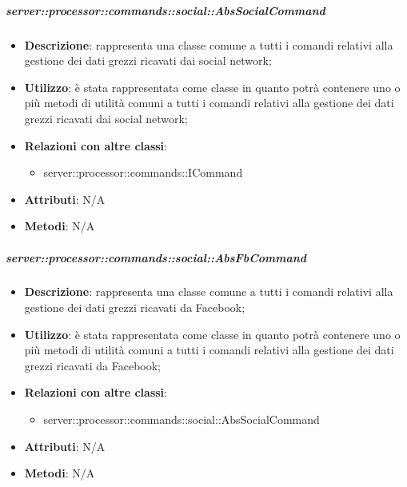         \subparagraph{server::processor::commands::social::AbsSocialCommand} %
        \label{subp:bdsm_app_server_processor_commands_social_abssocialcommand}
        \begin{itemize}
          \item \textbf{Descrizione}: rappresenta una classe comune a tutti i comandi relativi alla gestione dei dati grezzi ricavati dai social network;
          \item \textbf{Utilizzo}: è stata rappresentata come classe in quanto potrà contenere uno o più metodi di utilità comuni a tutti i comandi relativi alla gestione dei dati grezzi ricavati dai social network;
          \item \textbf{Relazioni con altre classi}:
            \begin{itemize}
              \item server::processor::commands::ICommand
            \end{itemize}
          \item \textbf{Attributi}: N/A
          \item \textbf{Metodi}: N/A
        \end{itemize}


        \subparagraph{server::processor::commands::social::AbsFbCommand} %
        \label{subp:bdsm_app_server_processor_commands_social_absfbcommand}
        \begin{itemize}
          \item \textbf{Descrizione}: rappresenta una classe comune a tutti i comandi relativi alla gestione dei dati grezzi ricavati da Facebook;
          \item \textbf{Utilizzo}: è stata rappresentata come classe in quanto potrà contenere uno o più metodi di utilità comuni a tutti i comandi relativi alla gestione dei dati grezzi ricavati da Facebook;
          \item \textbf{Relazioni con altre classi}:
            \begin{itemize}
              \item server::processor::commands::social::AbsSocialCommand
            \end{itemize}
          \item \textbf{Attributi}: N/A
          \item \textbf{Metodi}: N/A
        \end{itemize}

